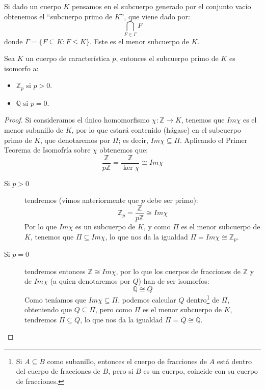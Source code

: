 \begin{definicion}
    Si dado un cuerpo $K$ pensamos en el subcuerpo generado por el conjunto vacío obtenemos el ``subcuerpo primo de $K$'', que viene dado por:
    \begin{equation*}
        \bigcap_{F\in \Gamma} F
    \end{equation*}
    donde $\Gamma = \{F\subseteq K : F\leq K\}$. Este es el menor subcuerpo de $K$.
\end{definicion}

\begin{prop}
    Sea $K$ un cuerpo de característica $p$, entonces el subcuerpo primo de $K$ es isomorfo a:
    \begin{itemize}
        \item $\mathbb{Z}_p$ si $p>0$.
        \item $\mathbb{Q}$ si $p = 0$.
    \end{itemize}
    \begin{proof}
        Si consideramos el único homomorfismo $\chi:\mathbb{Z}\to K$, tenemos que $Im\chi$ es el menor subanillo de $K$, por lo que estará contenido (hágase) en el subcuerpo primo de $K$, que denotaremos por $\Pi$; es decir, $Im\chi \subseteq \Pi$. Aplicando el Primer Teorema de Isomofría sobre $\chi$ obtenemos que:
        \begin{equation*}
            \dfrac{\mathbb{Z}}{p\mathbb{Z}} = \dfrac{\mathbb{Z}}{\ker\chi} \cong Im\chi 
        \end{equation*}
        \begin{description}
            \item [Si $p>0$] tendremos (vimos anteriormente que $p$ debe ser primo):
                \begin{equation*}
                    \mathbb{Z}_p = \dfrac{\mathbb{Z}}{p\mathbb{Z}} \cong Im\chi
                \end{equation*}
                Por lo que $Im\chi$ es un subcuerpo de $K$, y como $\Pi$ es el menor subcuerpo de $K$, tenemos que $\Pi\subseteq Im\chi$, lo que nos da la igualdad $\Pi = Im\chi \cong \mathbb{Z}_p$.
            \item [Si $p=0$] tendremos entonces $\mathbb{Z}\cong Im\chi$, por lo que los cuerpos de fracciones de $\mathbb{Z}$ y de $Im\chi$ (a quien denotaremos por $Q$) han de ser isomorfos:
                \begin{equation*}
                    \mathbb{Q}\cong Q
                \end{equation*}
                Como teníamos que $Im\chi \subseteq \Pi$, podemos calcular $Q$ dentro\footnote{Si $A\subseteq B$ como subanillo, entonces el cuerpo de fracciones de $A$ está dentro del cuerpo de fracciones de $B$, pero si $B$ es un cuerpo, coincide con su cuerpo de fracciones.} de $\Pi$, obteniendo que $Q\subseteq \Pi$, pero como $\Pi$ es el menor subcuerpo de $K$, tendremos $\Pi\subseteq Q$, lo que nos da la igualdad $\Pi = Q \cong \mathbb{Q}$.\qedhere
        \end{description}
    \end{proof}
\end{prop}

